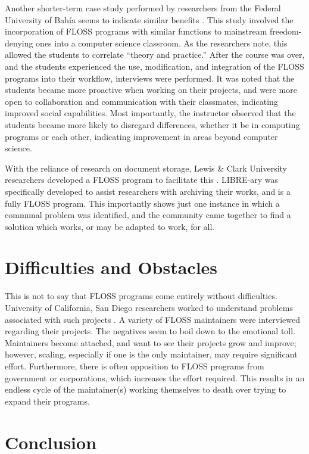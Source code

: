 \documentclass[conference]{IEEEtran}
\begin{document}
Another shorter-term case study performed by researchers from the Federal University of Bah\'ia seems to indicate similar benefits \cite{StudentExperience}. This study involved the incorporation of FLOSS programs with similar functions to mainstream freedom-denying ones into a computer science classroom. As the researchers note, this allowed the students to correlate ``theory and practice.'' After the course was over, and the students experienced the use, modification, and integration of the FLOSS programs into their workflow, interviews were performed. It was noted that the students became more proactive when working on their projects, and were more open to collaboration and communication with their classmates, indicating improved social capabilities. Most importantly, the instructor observed that the students became more likely to disregard differences, whether it be in computing programs or each other, indicating improvement in areas beyond computer science.

With the reliance of research on document storage, Lewis \& Clark University researchers developed a FLOSS program to facilitate this \cite{LIBREary}. LIBRE-ary was specifically developed to assist researchers with archiving their works, and is a fully FLOSS program. This importantly shows just one instance in which a communal problem was identified, and the community came together to find a solution which works, or may be adapted to work, for all.

\section{Difficulties and Obstacles}

This is not to say that FLOSS programs come entirely without difficulties. University of California, San Diego researchers worked to understand problems associated with such projects \cite{Labor}. A variety of FLOSS maintainers were interviewed regarding their projects. The negatives seem to boil down to the emotional toll. Maintainers become attached, and want to see their projects grow and improve; however, scaling, especially if one is the only maintainer, may require significant effort. Furthermore, there is often opposition to FLOSS programs from government or corporations, which increases the effort required. This results in an endless cycle of the maintainer(s) working themselves to death over trying to expand their programs.

\section{Conclusion}
\end{document}
